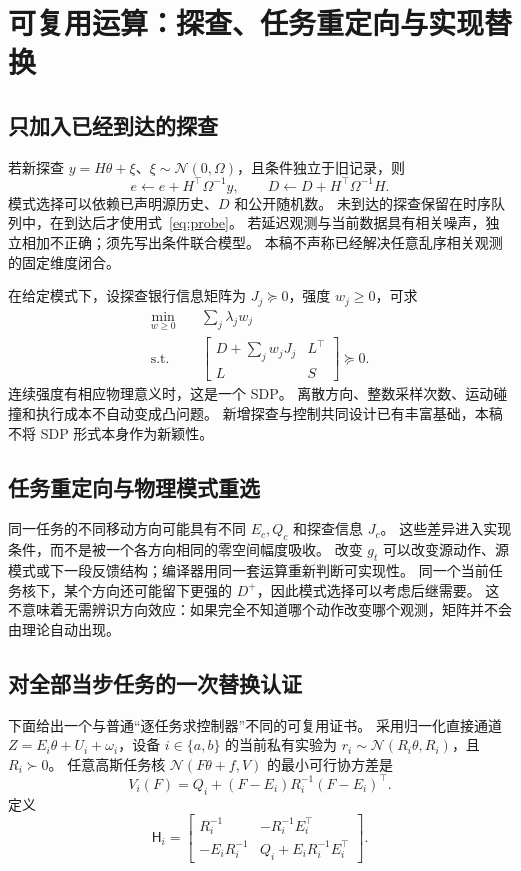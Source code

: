 \documentclass[UTF8,fontset=fandol,11pt,a4paper]{ctexart}
\newcommand{\N}{\mathcal N}
\theoremstyle{definition}
\theoremstyle{remark}
\numberwithin{equation}{section}
\begin{document}
\section{可复用运算：探查、任务重定向与实现替换}
\label{sec:operations}

\subsection{只加入已经到达的探查}
若新探查 $y=H\theta+\xi$、$\xi\sim\N(0,\Omega)$，且条件独立于旧记录，则
\begin{equation}
 e\leftarrow e+H^\top\Omega^{-1}y,\qquad
 D\leftarrow D+H^\top\Omega^{-1}H.
 \label{eq:probe}
\end{equation}
模式选择可以依赖已声明源历史、$D$ 和公开随机数。
未到达的探查保留在时序队列中，在到达后才使用式~\eqref{eq:probe}。
若延迟观测与当前数据具有相关噪声，独立相加不正确；须先写出条件联合模型。
本稿不声称已经解决任意乱序相关观测的固定维度闭合。

在给定模式下，设探查银行信息矩阵为 $J_j\succeq0$，强度 $w_j\ge0$，可求
\begin{align}
 \min_{w\ge0}\quad &\sum_j\lambda_jw_j\label{eq:probeSDP}\\
 \text{s.t.}\quad &
 \begin{bmatrix}
 D+\sum_jw_jJ_j&L^\top\\L&S
 \end{bmatrix}\succeq0.\nonumber
\end{align}
连续强度有相应物理意义时，这是一个 SDP。
离散方向、整数采样次数、运动碰撞和执行成本不自动变成凸问题。
新增探查与控制共同设计已有丰富基础，本稿不将 SDP 形式本身作为新颖性。

\subsection{任务重定向与物理模式重选}
同一任务的不同移动方向可能具有不同 $E_c,Q_c$ 和探查信息 $J_c$。
这些差异进入实现条件，而不是被一个各方向相同的零空间幅度吸收。
改变 $g_t$ 可以改变源动作、源模式或下一段反馈结构；编译器用同一套运算重新判断可实现性。
同一个当前任务核下，某个方向还可能留下更强的 $D^+$，因此模式选择可以考虑后继需要。
这不意味着无需辨识方向效应：如果完全不知道哪个动作改变哪个观测，矩阵并不会由理论自动出现。

\subsection{对全部当步任务的一次替换认证}
下面给出一个与普通“逐任务求控制器”不同的可复用证书。
采用归一化直接通道 $Z=E_i\theta+U_i+\omega_i$，设备 $i\in\{a,b\}$ 的当前私有实验为 $r_i\sim\N(R_i\theta,R_i)$，且 $R_i\succ0$。
任意高斯任务核 $\N(F\theta+f,V)$ 的最小可行协方差是
\begin{equation}
 V_i(F)=Q_i+(F-E_i)R_i^{-1}(F-E_i)^\top.
\end{equation}
定义
\begin{equation}
 \mathsf H_i=
 \begin{bmatrix}
 R_i^{-1}&-R_i^{-1}E_i^\top\\
 -E_iR_i^{-1}&Q_i+E_iR_i^{-1}E_i^\top
 \end{bmatrix}.
\end{equation}
\end{document}
